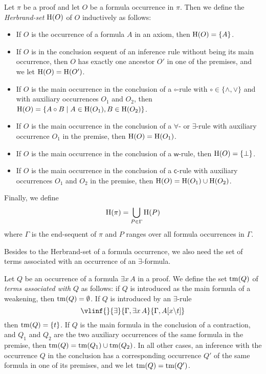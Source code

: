 \documentclass{LMCS}
\theoremstyle{plain}
\theoremstyle{definition}
\def\set#1{\{#1\}}
\def\weakr{\mathsf{weak}}
\def\conr{\mathsf{cont}}
\newcommand{\sop}{[}
\newcommand{\scl}{]}
\newcommand{\sel}[2]{#1 \backslash #2}
\newcommand{\unsubst}[2]{\sop \sel{#1}{#2} \scl}
\def\weakr{\mathsf{w}}
\def\conr{\mathsf{c}}
\begin{document}
\begin{defi}\label{def.Hseq}
  Let $\pi$ be a proof and let $O$ be a formula occurrence in
  $\pi$. Then we define the \emph{Herbrand-set} $\mathrm{H}(O)$ of $O$
  inductively as follows:
  \begin{itemize}
  \item If $O$ is the occurrence of a formula $A$ in an axiom, then
    $\Hseq(O)=\set{A}$.
  \item If $O$ is in the conclusion sequent of an inference rule
    without being its main occurrence, then $O$ has exactly one
    ancestor $O'$ in one of the premises, and we let
    $\mathrm{H}(O)=\mathrm{H}(O')$.
  \item If $O$ is the main occurrence in the conclusion of a $\circ$-rule with
    $\circ\in\set{\land,\lor}$ and with auxiliary occurrences $O_1$
    and $O_2$, then $\Hseq(O)=\set{A\circ B\mid A\in\Hseq(O_1),
      B\in\Hseq(O_2)}$.
  \item If $O$ is the main occurrence in the conclusion of a
    $\forall$- or $\exists$-rule with auxiliary occurrence $O_1$ in the
    premise, then $\mathrm{H}(O)=\mathrm{H}(O_1)$.
  \item If $O$ is the main occurrence in the conclusion of a $\weakr$-rule, then
    $\Hseq(O)=\set{\bot}$.
  \item If $O$ is the main occurrence in the conclusion of a $\conr$-rule with auxiliary
    occurrences $O_1$ and $O_2$ in the premise, then
    $\mathrm{H}(O)=\mathrm{H}(O_1)\cup\mathrm{H}(O_2)$.
  \end{itemize}
  Finally, we define $$\mathrm{H}(\pi)=\bigcup_{P\in\Gamma}\mathrm{H}(P)$$ 
  where
  $\Gamma$ is the end-sequent of $\pi$ and $P$ ranges over all formula
  occurrences in $\Gamma$.
\end{defi}

Besides to the Herbrand-set of a formula occurrence, we also need the
set of terms associated with an occurrence of an $\exists$-formula.

\begin{defi}
  Let $Q$ be an occurrence of a formula $\exists x\, A$ in a proof. We
  define the set $\mathrm{tm}(Q)$ of \emph{terms associated with $Q$} as
  follows: if $Q$ is introduced as the main formula of a weakening,
  then $\mathrm{tm}(Q)=\emptyset$. If $Q$ is introduced by an $\exists$-rule 
  \begin{equation*}
    \vlinf{}{\exists}{\Gamma, \exists x\, A}{\Gamma,A\unsubst{x}{t}}
  \end{equation*}
  then $\terms{Q}=\set{t}$. If $Q$ is the main formula in the
  conclusion of a contraction, and $Q_1$ and $Q_2$ are the two auxiliary
  occurrences of the same formula in the premise,
  then $\mathrm{tm}(Q)=\mathrm{tm}(Q_1)\cup\mathrm{tm}(Q_2)$. In all other cases, an
  inference with the occurrence $Q$ in the conclusion has a
  corresponding occurrence $Q'$ of the same formula in one of its
  premises, and we let $\mathrm{tm}(Q)=\mathrm{tm}(Q')$.
\end{defi}
\end{document}
